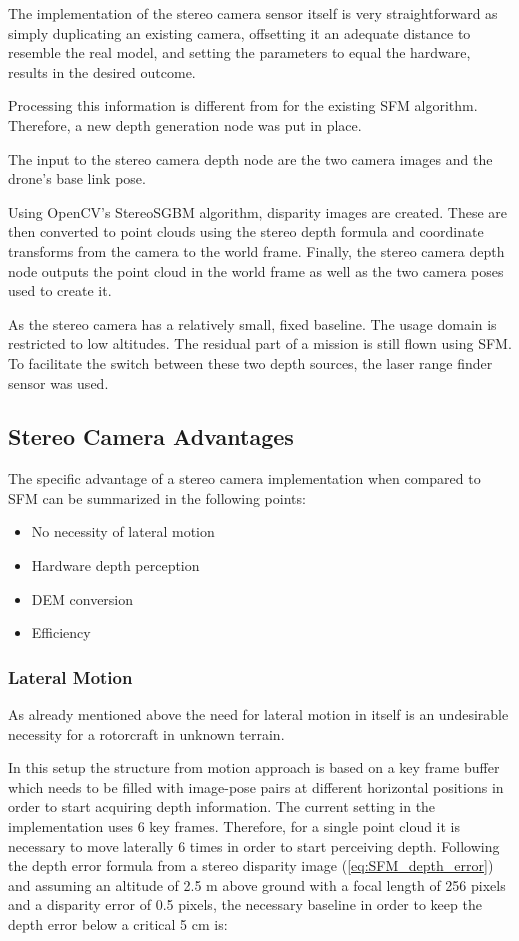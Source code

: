 The implementation of the stereo camera sensor itself is very straightforward as simply duplicating an existing camera, offsetting it an adequate distance to resemble the real model, and setting the parameters to equal the hardware, results in the desired outcome.

Processing this information is different from for the existing SFM algorithm. Therefore, a new depth generation node was put in place. 

The input to the stereo camera depth node are the two camera images and the drone's base link pose.

Using OpenCV's StereoSGBM algorithm, disparity images are created. These are then converted to point clouds using the stereo depth formula and coordinate transforms from the camera to the world frame. Finally, the stereo camera depth node outputs the point cloud in the world frame as well as the two camera poses used to create it.

As the stereo camera has a relatively small, fixed baseline. The usage domain is restricted to low altitudes. The residual part of a mission is still flown using SFM. To facilitate the switch between these two depth sources, the laser range finder sensor was used.

\subsection{Stereo Camera Advantages}

The specific advantage of a stereo camera implementation when compared to SFM can be summarized in the following points:

\begin{itemize}
    \item No necessity of lateral motion
    \item Hardware depth perception
    \item DEM conversion
    \item Efficiency
\end{itemize}

\subsubsection{Lateral Motion}

As already mentioned above the need for lateral motion in itself is an undesirable necessity for a rotorcraft in unknown terrain. 

In this setup the structure from motion approach is based on a key frame buffer which needs to be filled with image-pose pairs at different horizontal positions in order to start acquiring depth information. The current setting in the implementation \citet{SFM} uses 6 key frames. Therefore, for a single point cloud it is necessary to move laterally 6 times in order to start perceiving depth. Following the depth error formula from a stereo disparity image (\ref{eq:SFM_depth_error}) and assuming an altitude of 2.5 m above ground with a focal length of 256 pixels and a disparity error of 0.5 pixels, the necessary baseline in order to keep the depth error below a critical 5 cm is:

